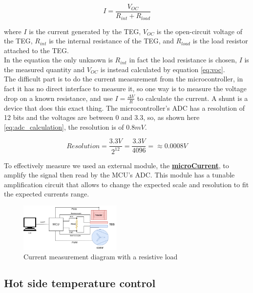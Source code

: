 \begin{equation}
  I = \frac{V_{OC}}{R_{int} + R_{load}}
\end{equation}

where $I$ is the current generated by the TEG, $ V_{OC} $ is the open-circuit voltage of the TEG, $ R_{int} $ is the internal resistance of the TEG, and $ R_{load} $ is the load resistor attached to the TEG.
\\
In the equation the only unknown is $R_{int}$ in fact the load resistance is chosen, $ I $ is the measured quantity and $ V_{OC} $ is instead calculated by equation \ref{eq:voc}.\\
The difficult part is to do the current measurement from the microcontroller, in fact it has no direct interface to measure it, so one way is to measure the voltage drop on a known resistance, and use $ I =  \frac{\Delta V}{R} $ to calculate the current. A shunt is a device that does this exact thing. The microcontroller's ADC has a resolution of 12 bits and the voltages are between 0 and 3.3, so, as shown here \ref{eq:adc_calculation}, the resolution is of $ 0.8 mV $.

\begin{equation}
  Resolution = \frac{3.3 V}{2^{12}} = \frac{3.3 V}{4096} = \approx 0.0008 V
  \label{eq:adc_calculation}
\end{equation}

To effectively measure we used an external module, the \href{https://www.eevblog.com/projects/ucurrent/}{\textbf{microCurrent}}, to amplify the signal then read by the MCU's ADC. This module has a tunable amplification circuit that allows to change the expected scale and resolution to fit the expected currents range.

\begin{figure}[h]
  \centering
  \includegraphics[width=0.45\textwidth]{assets/load_schema.png}
  \caption{Current measurement diagram with a resistive load}
\end{figure}


\subsection{Hot side temperature control}

